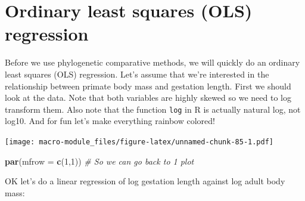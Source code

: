 \documentclass[]{book}
\newenvironment{Shaded}{\begin{snugshade}}{\end{snugshade}}
\newcommand{\KeywordTok}[1]{\textcolor[rgb]{0.13,0.29,0.53}{\textbf{{#1}}}}
\newcommand{\DataTypeTok}[1]{\textcolor[rgb]{0.13,0.29,0.53}{{#1}}}
\newcommand{\DecValTok}[1]{\textcolor[rgb]{0.00,0.00,0.81}{{#1}}}
\newcommand{\CommentTok}[1]{\textcolor[rgb]{0.56,0.35,0.01}{\textit{{#1}}}}
\newcommand{\NormalTok}[1]{{#1}}
\begin{document}
\section{Ordinary least squares (OLS)
regression}\label{ordinary-least-squares-ols-regression}

Before we use phylogenetic comparative methods, we will quickly do an
ordinary least squares (OLS) regression. Let's assume that we're
interested in the relationship between primate body mass and gestation
length. First we should look at the data. Note that both variables are
highly skewed so we need to log transform them. Also note that the
function \texttt{log} in R is actually natural log, not log10. And for
fun let's make everything rainbow colored!

\begin{Shaded}
\end{Shaded}

\texttt{[image: macro-module\_files/figure-latex/unnamed-chunk-85-1.pdf]}

\begin{Shaded}
\begin{Highlighting}[]
\KeywordTok{par}\NormalTok{(}\DataTypeTok{mfrow =} \KeywordTok{c}\NormalTok{(}\DecValTok{1}\NormalTok{,}\DecValTok{1}\NormalTok{)) }\CommentTok{# So we can go back to 1 plot}
\end{Highlighting}
\end{Shaded}

OK let's do a linear regression of log gestation length against log
adult body mass:
\end{document}
